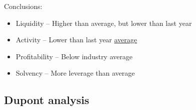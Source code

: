 \documentclass[../notes_compiled.tex]{subfiles}
\begin{document}
\begin{itemize}
{}
{\color{RoyalBlue}
\item Conclusions:
\begin{itemize}
\item Liquidity -- Higher than average, but lower than last year
\item Activity -- Lower than last year \underline{average}
\item Profitability -- Below industry average
\item Solvency -- More leverage than average
\end{itemize}

}

\end{itemize}

\subsection{Dupont analysis}
\end{document}

